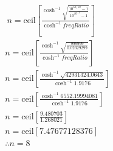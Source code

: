 \begin{align*} \
    n = \text{ceil} \left[ \frac{\cosh^{-1}{\sqrt{\frac{10^{60/10}- 1}{10^{10^{-2}}-1}}}}{\cosh^{-1}{freqRatio}} \right] \\
    n = \text{ceil} \left[ \frac{\cosh^{-1}{\sqrt{\frac{999999}{0.02329299}}}}{\cosh^{-1}{freqRatio}} \right]            \\
    n = \text{ceil} \left[ \frac{\cosh^{-1}{\sqrt{42931324.0643}}}{\cosh^{-1}{1.9176}} \right]                           \\
    n = \text{ceil} \left[ \frac{\cosh^{-1}{6552.19994081}}{\cosh^{-1}{1.9176}} \right]                                  \\n = \text{ceil} \left[ \frac{9.480703}{1.268021} \right]                                     \\
    n = \text{ceil} [7.47677128376]                                                                                      \\
    \therefore n = 8
\end{align*}
